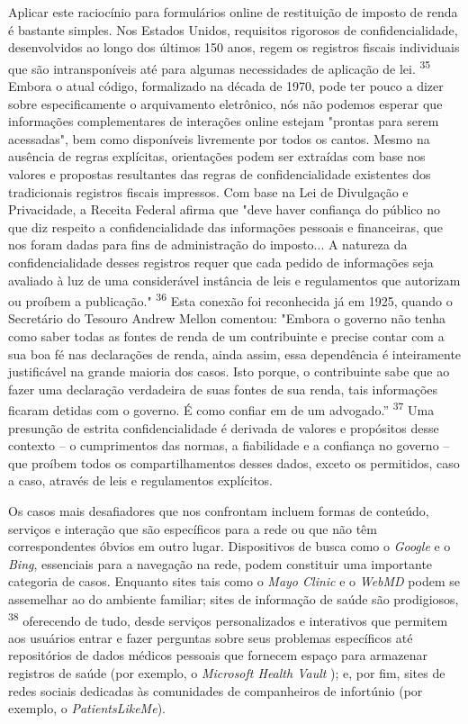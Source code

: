 Aplicar este raciocínio para formulários online de restituição de
imposto de renda é bastante simples. Nos Estados Unidos, requisitos
rigorosos de confidencialidade, desenvolvidos ao longo dos últimos 150
anos, regem os registros fiscais individuais que são intransponíveis até
para algumas necessidades de aplicação de lei. \textsuperscript{{35}}
Embora o atual código, formalizado na década de 1970, pode ter pouco a
dizer sobre especificamente o arquivamento eletrônico, nós não podemos
esperar que informações complementares de interações online estejam
"prontas para serem acessadas", bem como disponíveis livremente por
todos os cantos. Mesmo na ausência de regras explícitas, orientações
podem ser extraídas com base nos valores e propostas resultantes das
regras de confidencialidade existentes dos tradicionais registros
fiscais impressos. Com base na Lei de Divulgação e Privacidade, a
Receita Federal afirma que "deve haver confiança do público no que diz
respeito a confidencialidade das informações pessoais e financeiras, que
nos foram dadas para fins de administração do imposto... A natureza da
confidencialidade desses registros requer que cada pedido de informações
seja avaliado à luz de uma considerável instância de leis e regulamentos
que autorizam ou proíbem a publicação." \textsuperscript{{36}} Esta
conexão foi reconhecida já em 1925, quando o Secretário do Tesouro
Andrew Mellon comentou: "Embora o governo não tenha como saber todas as
fontes de renda de um contribuinte e precise contar com a sua boa fé nas
declarações de renda, ainda assim, essa dependência é inteiramente
justificável na grande maioria dos casos. Isto porque, o contribuinte
sabe que ao fazer uma declaração verdadeira de suas fontes de sua renda,
tais informações ficaram detidas com o governo. É como confiar em de um
advogado.'' \textsuperscript{{37}} Uma presunção de estrita
confidencialidade é derivada de valores e propósitos desse contexto -- o
cumprimentos das normas, a fiabilidade e a confiança no governo -- que
proíbem todos os compartilhamentos desses dados, exceto os permitidos,
caso a caso, através de leis e regulamentos explícitos.

Os casos mais desafiadores que nos confrontam incluem formas de
conteúdo, serviços e interação que são específicos para a rede ou que
não têm correspondentes óbvios em outro lugar. Dispositivos de busca
como o \emph{Google} e o \emph{Bing}, essenciais para a navegação na
rede, podem constituir uma importante categoria de casos. Enquanto sites
tais como o \emph{Mayo Clinic} e o \emph{WebMD} podem se assemelhar ao
do ambiente familiar; sites de informação de saúde são prodigiosos,
\textsuperscript{{38}} oferecendo de tudo, desde serviços personalizados
e interativos que permitem aos usuários entrar e fazer perguntas sobre
seus problemas específicos até repositórios de dados médicos pessoais
que fornecem espaço para armazenar registros de saúde (por exemplo, o
\emph{Microsoft Health Vault} ); e, por fim, sites de redes sociais
dedicadas às comunidades de companheiros de infortúnio (por exemplo, o
\emph{PatientsLikeMe}).

